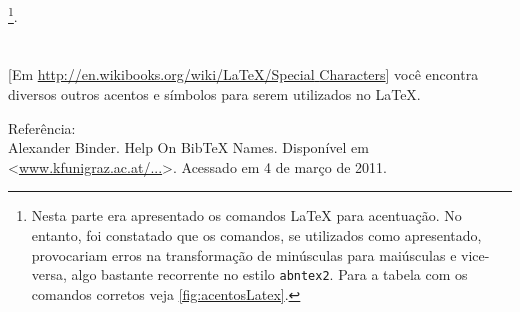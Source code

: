\begin{anexosenv}
\footnote{Nesta parte era apresentado os comandos \LaTeX{} para acentuação. No entanto, foi constatado que os comandos, se utilizados como apresentado, provocariam erros na transformação de  minúsculas para maiúsculas e vice-versa, algo bastante recorrente no estilo \texttt{abntex2}. Para a tabela com os comandos corretos veja \autoref{fig:acentosLatex}.}.
\\
\\
\\

[Em \href{http://en.wikibooks.org/wiki/LaTeX/Special_Characters}{http://en.wikibooks.org/wiki/LaTeX/Special\underline{ }Characters}] você encontra diversos outros acentos e símbolos para serem utilizados no LaTeX.


Referência:\\

Alexander Binder. Help On BibTeX Names. Disponível em <\href{www.kfunigraz.ac.at/~binder/texhelp/bibtx-23.html}{www.kfunigraz.ac.at/...}>. Acessado em 4 de março de 2011.




\end{anexosenv}